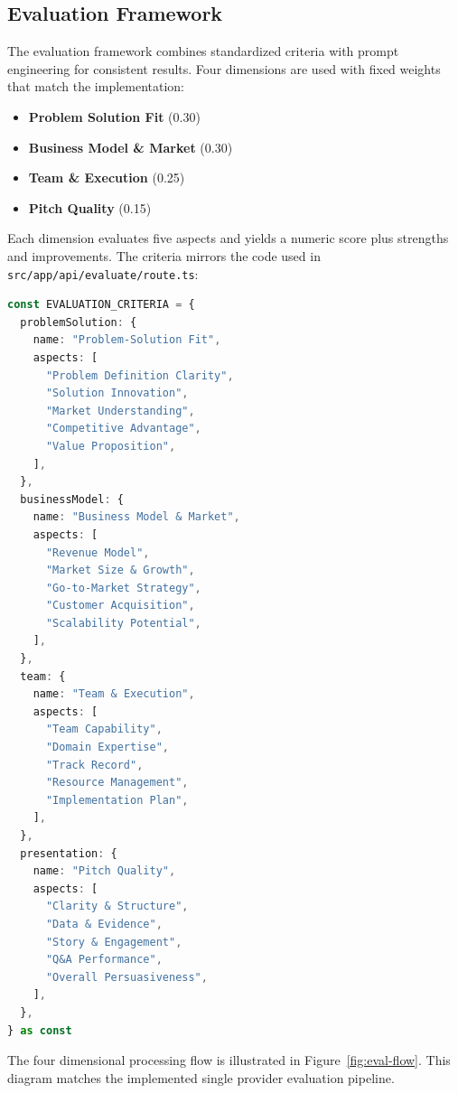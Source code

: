 \subsection{Evaluation Framework}\label{subsec:evaluation-framework}
The evaluation framework combines standardized criteria with prompt engineering for consistent results. Four dimensions are used with fixed weights that match the implementation:

\begin{itemize}
  \item \textbf{Problem Solution Fit} (0.30)
  \item \textbf{Business Model \& Market} (0.30)
  \item \textbf{Team \& Execution} (0.25)
  \item \textbf{Pitch Quality} (0.15)
\end{itemize}

Each dimension evaluates five aspects and yields a numeric score plus strengths and improvements. The criteria mirrors the code used in \texttt{src/app/api/evaluate/route.ts}:

\begin{lstlisting}[language=TypeScript, caption={Core evaluation criteria (excerpt)}]
const EVALUATION_CRITERIA = {
  problemSolution: {
    name: "Problem-Solution Fit",
    aspects: [
      "Problem Definition Clarity",
      "Solution Innovation",
      "Market Understanding",
      "Competitive Advantage",
      "Value Proposition",
    ],
  },
  businessModel: {
    name: "Business Model & Market",
    aspects: [
      "Revenue Model",
      "Market Size & Growth",
      "Go-to-Market Strategy",
      "Customer Acquisition",
      "Scalability Potential",
    ],
  },
  team: {
    name: "Team & Execution",
    aspects: [
      "Team Capability",
      "Domain Expertise",
      "Track Record",
      "Resource Management",
      "Implementation Plan",
    ],
  },
  presentation: {
    name: "Pitch Quality",
    aspects: [
      "Clarity & Structure",
      "Data & Evidence",
      "Story & Engagement",
      "Q&A Performance",
      "Overall Persuasiveness",
    ],
  },
} as const
\end{lstlisting}

The four dimensional processing flow is illustrated in Figure~\ref{fig:eval-flow}. This diagram matches the implemented single provider evaluation pipeline.

